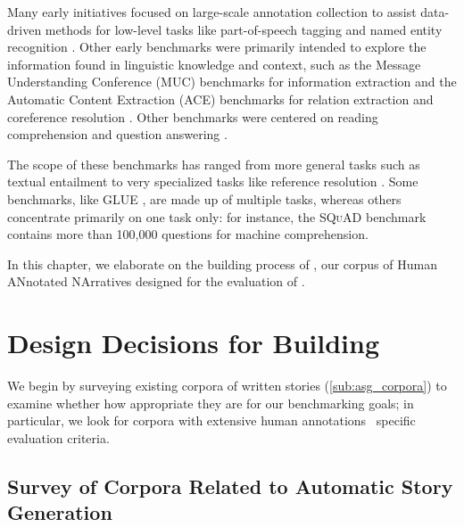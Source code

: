 Many early initiatives focused on large-scale annotation collection to assist data-driven methods for low-level tasks like part-of-speech tagging \citep{marcus1993building} and named entity recognition \citep{grishman1996message}. Other early benchmarks were primarily intended to explore the information found in linguistic knowledge and context, such as the Message Understanding Conference (MUC) benchmarks for information extraction \citep{sundheim1993tipster} and the Automatic Content Extraction (ACE) benchmarks for relation extraction and coreference resolution \citep{doddington2004automatic}. Other benchmarks were centered on reading comprehension \citep{hirschman1999deep} and question answering \citep{kocisky2018narrativeqa}. 

The scope of these benchmarks has ranged from more general tasks such as textual entailment \citep{dagan2006pascal} to very specialized tasks like reference resolution \citep{levesque2011winograd}. Some benchmarks, like GLUE \citep{wang-etal-2018-glue}, are made up of multiple tasks, whereas others concentrate primarily on one task only: for instance, the \textsc{SQuAD} benchmark \citep{rajpurkar2016squad} contains more than 100,000 questions for machine comprehension.

In this chapter, we elaborate on the building process of {\hanna}, our corpus of Human ANnotated NArratives designed for the evaluation of {\asgfull}.

\section{Design Decisions for Building \hanna}
\label{sec:decision_process_hanna}

We begin by surveying existing corpora of written stories (\autoref{sub:asg_corpora}) to examine whether how appropriate they are for our benchmarking goals; in particular, we look for corpora with extensive human annotations {\wrt}\ specific evaluation criteria.

\subsection{Survey of Corpora Related to Automatic Story Generation}
\label{sub:asg_corpora}

